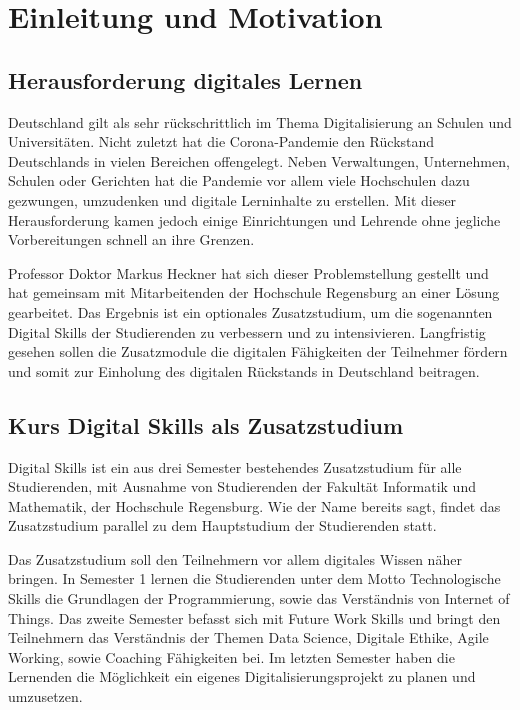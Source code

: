 \section{Einleitung und Motivation}\label{einleitung}
\subsection{Herausforderung digitales Lernen}\label{herausforderung}
Deutschland gilt als sehr rückschrittlich im Thema Digitalisierung an Schulen
und Universitäten. Nicht zuletzt hat die Corona-Pandemie den Rückstand
Deutschlands in vielen Bereichen offengelegt. Neben Verwaltungen, Unternehmen,
Schulen oder Gerichten hat die Pandemie vor allem viele Hochschulen dazu
gezwungen, umzudenken und digitale Lerninhalte zu erstellen. Mit dieser
Herausforderung kamen jedoch einige Einrichtungen und Lehrende ohne jegliche
Vorbereitungen schnell an ihre Grenzen. \parencite{bmwi-rueckstand}

Professor Doktor Markus Heckner hat sich dieser Problemstellung gestellt und
hat gemeinsam mit Mitarbeitenden der Hochschule Regensburg an einer Lösung
gearbeitet. Das Ergebnis ist ein optionales Zusatzstudium, um die sogenannten
\glqq Digital Skills\grqq{} der Studierenden zu verbessern und zu intensivieren.
Langfristig gesehen sollen die Zusatzmodule die digitalen Fähigkeiten der
Teilnehmer fördern und somit zur Einholung des digitalen Rückstands in
Deutschland beitragen.

\subsection{Kurs Digital Skills als Zusatzstudium}\label{kurs-digital-skills}
Digital Skills ist ein aus drei Semester bestehendes Zusatzstudium für alle
Studierenden, mit Ausnahme von Studierenden der Fakultät Informatik und
Mathematik, der Hochschule Regensburg. Wie der Name bereits sagt, findet das
Zusatzstudium parallel zu dem Hauptstudium der Studierenden statt.

Das Zusatzstudium soll den Teilnehmern vor allem digitales Wissen näher bringen.
In Semester 1 lernen die Studierenden unter dem Motto
\glqq Technologische Skills\grqq{}
die Grundlagen der Programmierung, sowie das Verständnis von Internet of Things.
Das zweite Semester befasst sich mit \glqq Future Work Skills\grqq{} und bringt
den Teilnehmern das Verständnis der Themen Data Science, Digitale Ethike, Agile
Working, sowie Coaching Fähigkeiten bei. Im letzten Semester haben die Lernenden
die Möglichkeit ein eigenes Digitalisierungsprojekt zu planen und umzusetzen.

